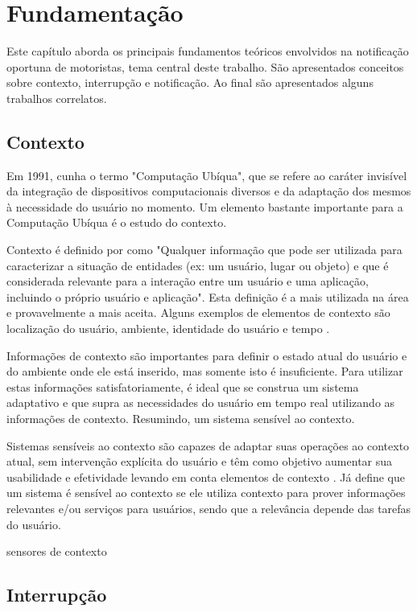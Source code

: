 \chapter{Fundamentação}
\label{fundamentacao}
Este capítulo aborda os principais fundamentos teóricos envolvidos na notificação oportuna de motoristas,
tema central deste trabalho. São apresentados conceitos sobre contexto, interrupção e notificação.
Ao final são apresentados alguns trabalhos correlatos.

\section{Contexto}
\label{contexto}
Em 1991, \cite{weiser1991computer} cunha o termo "Computação Ubíqua", que se refere ao caráter invisível da
integração de dispositivos computacionais diversos e da adaptação dos mesmos à necessidade do usuário no momento.
Um elemento bastante importante para a Computação Ubíqua é o estudo do contexto.

Contexto é definido por \cite{dey2001understanding} como "Qualquer informação que pode ser utilizada para
caracterizar a situação de entidades (ex: um usuário, lugar ou objeto) e que é considerada relevante para
a interação entre um usuário e uma aplicação, incluindo o próprio usuário e aplicação". Esta definição é
a mais utilizada na área e provavelmente a mais aceita. Alguns exemplos de elementos de contexto são
localização do usuário, ambiente, identidade do usuário e tempo \cite{ryan1999enhanced}.

Informações de contexto são importantes para definir o estado atual do usuário e do ambiente onde ele está
inserido, mas somente isto é insuficiente. Para utilizar estas informações satisfatoriamente, é ideal que
se construa um sistema adaptativo e que supra as necessidades do usuário em tempo real utilizando as
informações de contexto. Resumindo, um sistema sensível ao contexto.

Sistemas sensíveis ao contexto são capazes de adaptar suas operações ao contexto atual, sem intervenção
explícita do usuário e têm como objetivo aumentar sua usabilidade e efetividade levando em conta elementos
de contexto \cite{baldauf2007survey}. Já \cite{abowd1999towards} define que um sistema é sensível ao contexto
se ele utiliza contexto para prover informações relevantes e/ou serviços para usuários, sendo que a relevância
depende das tarefas do usuário.

sensores de contexto

\section{Interrupção}
\label{interrupcao}

